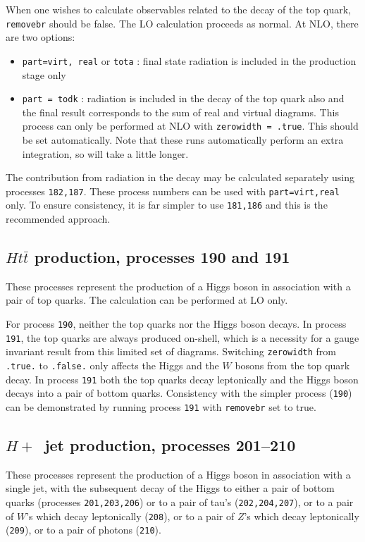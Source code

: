 \documentclass[12pt]{article}
\begin{document}
When one wishes to calculate observables related to the decay of the top
quark, {\tt removebr} should be false.
The LO calculation proceeds as normal. At NLO, there are two options:
\begin{itemize}
\item {\tt part=virt, real} or {\tt tota} : final state radiation is included
in the production stage only
\item {\tt part = todk} : radiation is included in the decay of the top
quark also and the final result corresponds to the sum of real and virtual
diagrams. This process can only be performed at NLO with 
{\tt zerowidth = .true}. This should be set automatically.
Note that these runs automatically perform an extra integration, so
will take a little longer.
\end{itemize}

The contribution from radiation in the decay may be calculated separately using
processes {\tt 182,187}. These process numbers can be used with {\tt part=virt,real}
only. To ensure consistency, it is far simpler to use {\tt 181,186}
and this is the recommended approach.

\subsection{$Ht{\bar t}$ production, processes 190 and 191}
\label{subsec:htt}

These processes represent the production of a Higgs boson in association
with a pair of top quarks. The calculation can be performed at LO only.

For process {\tt 190}, neither the top quarks nor the Higgs boson
decays. In process {\tt 191}, the top quarks are always
produced on-shell, which is a necessity for a gauge invariant result
from this limited set of diagrams.
Switching {\tt zerowidth} from {\tt .true.} to {\tt .false.} only affects
the Higgs and the $W$ bosons from the top quark decay.
In process {\tt 191} both the top quarks decay leptonically
and the Higgs boson decays into a pair of bottom quarks. 
Consistency with
the simpler process ({\tt 190}) can be demonstrated by running process
{\tt 191} with {\tt removebr} set to true.

\subsection{$H+$~jet production, processes 201--210}
\label{subsec:hjet}

These processes represent the production of a Higgs boson in association
with a single jet, with the subsequent decay of the Higgs to either
a pair of bottom quarks (processes {\tt 201,203,206}) 
or to a pair of tau's ({\tt 202,204,207}),
or to a pair of $W$'s which decay leptonically ({\tt 208}),
or to a pair of $Z$'s which decay leptonically ({\tt 209}),
or to a pair of photons ({\tt 210}).
\end{document}
